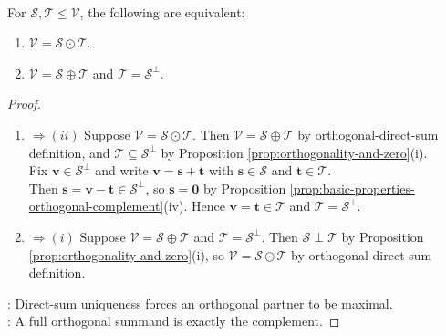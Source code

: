 \begin{proposition} \label{prop:orthogonal-direct-sum-characterization} \\
For $\mathcal{S},\mathcal{T}\leq\mathcal{V}$, the following are equivalent:
\begin{enumerate}[label=(\roman*)]
\setlength{\itemsep}{0pt}
\item $\mathcal{V}=\mathcal{S}\odot\mathcal{T}$.
\item $\mathcal{V}=\mathcal{S}\oplus\mathcal{T}$ and $\mathcal{T}=\mathcal{S}^{\perp}$.
\end{enumerate}
\begin{proof}
\begin{enumerate}[label=(\roman*)]
\setlength{\itemsep}{0pt}
\item[$(i)$]$\Rightarrow (ii)$ Suppose $\mathcal{V}=\mathcal{S}\odot\mathcal{T}$. Then $\mathcal{V}=\mathcal{S}\oplus\mathcal{T}$ by orthogonal-direct-sum definition, and $\mathcal{T}\subseteq\mathcal{S}^{\perp}$ by Proposition \ref{prop:orthogonality-and-zero}(i).\\
Fix $\mathbf{v}\in\mathcal{S}^{\perp}$ and write $\mathbf{v}=\mathbf{s}+\mathbf{t}$ with $\mathbf{s}\in\mathcal{S}$ and $\mathbf{t}\in\mathcal{T}$.\\
Then $\mathbf{s}=\mathbf{v}-\mathbf{t}\in\mathcal{S}^{\perp}$, so $\mathbf{s}=\mathbf{0}$ by Proposition \ref{prop:basic-properties-orthogonal-complement}(iv). Hence $\mathbf{v}=\mathbf{t}\in\mathcal{T}$ and $\mathcal{T}=\mathcal{S}^{\perp}$. \item[$(ii)$]$\Rightarrow (i)$ Suppose $\mathcal{V}=\mathcal{S}\oplus\mathcal{T}$ and $\mathcal{T}=\mathcal{S}^{\perp}$. Then $\mathcal{S}\perp\mathcal{T}$ by Proposition \ref{prop:orthogonality-and-zero}(i), so $\mathcal{V}=\mathcal{S}\odot\mathcal{T}$ by orthogonal-direct-sum definition.
\end{enumerate}
: Direct-sum uniqueness forces an orthogonal partner to be maximal.\\
: A full orthogonal summand is exactly the complement.
\end{proof}
\end{proposition}

